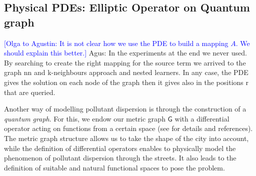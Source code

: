 \documentclass[11pt,a4paper,twoside]{article}
\theoremstyle{definition}
\numberwithin{equation}{section}
\newcommand{\G}{\ensuremath{\textsf{G}}} %
\newcommand{\<}{\langle}
\renewcommand{\>}{\rangle}
\newcommand{\ascomment}[1]{{\color{teal} Agus: #1}}
\newcommand{\om}[1]{\textcolor{blue}{#1}}
\begin{document}
\subsection{Physical PDEs: Elliptic Operator on Quantum graph}
\label{sec:PDE}
\om{[Olga to Agustin: It is not clear how we use the PDE to build a mapping $A$. We should explain this better.]}
\ascomment{In the experiments at the end we never used. By searching to create the right mapping for the source term we arrived to the graph nn and k-neighbours approach and nested learners. In any case, the PDE gives the solution on each node of the graph then it gives also in the positions r that are queried.}

Another way of modelling pollutant dispersion is through the construction of a \emph{quantum graph}. For this, we endow our metric graph $\G$ with a differential operator acting on functions from a certain space (see \cite{BK2013} for details and references). The metric graph structure allows us to take the shape of the city into account, while the definition of differential operators enables to physically model the phenomenon of pollutant dispersion through the streets. It also leads to the definition of suitable and natural functional spaces to pose the problem.

\end{document}
